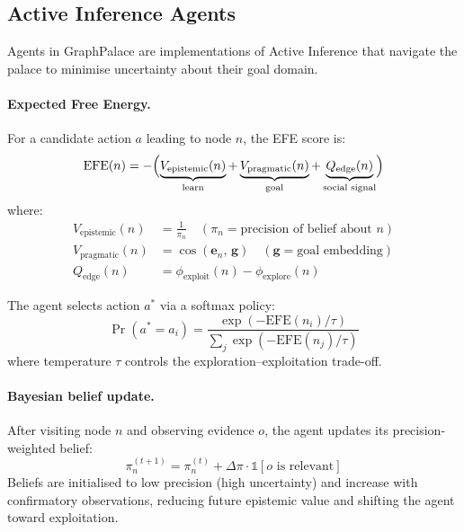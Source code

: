 \documentclass[11pt,a4paper]{article}
\begin{document}
\subsection{Active Inference Agents}
\label{sec:agents}

Agents in GraphPalace are implementations of Active Inference \cite{friston2010}
that navigate the palace to minimise uncertainty about their goal domain.

\paragraph{Expected Free Energy.}
For a candidate action $a$ leading to node $n$, the EFE score is:
\begin{equation}
\text{EFE}(n) = -\Bigl(\underbrace{V_{\text{epistemic}}(n)}_{\text{learn}}
                      + \underbrace{V_{\text{pragmatic}}(n)}_{\text{goal}}
                      + \underbrace{Q_{\text{edge}}(n)}_{\text{social signal}}\Bigr)
\label{eq:efe}
\end{equation}
where:
\begin{align}
V_{\text{epistemic}}(n) &= \frac{1}{\pi_n} \quad (\pi_n = \text{precision of belief about } n)
\label{eq:epistemic}\\
V_{\text{pragmatic}}(n) &= \cos(\mathbf{e}_n,\, \mathbf{g}) \quad (\mathbf{g} = \text{goal embedding})
\label{eq:pragmatic}\\
Q_{\text{edge}}(n)      &= \phi_{\text{exploit}}(n) - \phi_{\text{explore}}(n)
\label{eq:social}
\end{align}

The agent selects action $a^*$ via a softmax policy:
\begin{equation}
\Pr(a^* = a_i) = \frac{\exp(-\text{EFE}(n_i) / \tau)}{\sum_j \exp(-\text{EFE}(n_j) / \tau)}
\label{eq:softmax}
\end{equation}
where temperature $\tau$ controls the exploration--exploitation trade-off.

\paragraph{Bayesian belief update.}
After visiting node $n$ and observing evidence $o$, the agent updates its
precision-weighted belief:
\begin{equation}
\pi_n^{(t+1)} = \pi_n^{(t)} + \Delta\pi \cdot \mathbb{1}[o \text{ is relevant}]
\label{eq:belief}
\end{equation}
Beliefs are initialised to low precision (high uncertainty) and increase with
confirmatory observations, reducing future epistemic value and shifting the
agent toward exploitation.
\end{document}
